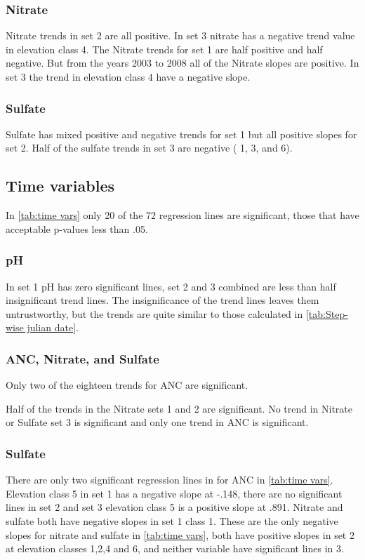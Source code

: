 \subsubsection{Nitrate}
Nitrate trends in set 2 are all positive.  In set 3 nitrate has a negative trend value in elevation class 4.  The Nitrate trends for set 1 are half positive and half negative.  But from the years 2003 to 2008 all of the Nitrate slopes are positive.  In set 3 the trend in elevation class 4  have a negative slope. 

\subsubsection{Sulfate}
 Sulfate has mixed positive and negative trends for set 1 but all positive slopes for set 2.   Half of the sulfate trends in set 3 are negative ( 1, 3, and 6).

\subsection{Time variables}
In \autoref{tab:time vars} only 20 of the 72 regression lines are significant, those that have acceptable p-values less than .05. 

\subsubsection{pH}
In set 1 pH has zero significant lines, set 2 and 3 combined are less than half insignificant trend lines.  The insignificance of the trend lines leaves them untrustworthy, but the trends are quite similar to those calculated in \autoref{tab:Step-wise julian date}.

\subsubsection{ANC, Nitrate, and Sulfate}
Only two of the eighteen trends for ANC are significant.  


Half of the trends in the Nitrate sets 1 and 2 are significant. No trend in Nitrate or Sulfate set 3 is significant and only one trend in ANC is significant.


\subsubsection{Sulfate}


There are only two significant regression lines in for ANC in \autoref{tab:time vars}.  Elevation class 5 in set 1 has a negative slope at -.148, there are no significant lines in set 2 and set 3 elevation class 5 is a positive slope at .891.  Nitrate and sulfate both have negative slopes in set 1 class 1.  These are the only negative slopes for nitrate and sulfate in \autoref{tab:time vars}, both have positive slopes in set 2 at elevation classes 1,2,4 and 6, and neither variable have significant lines in 3.

